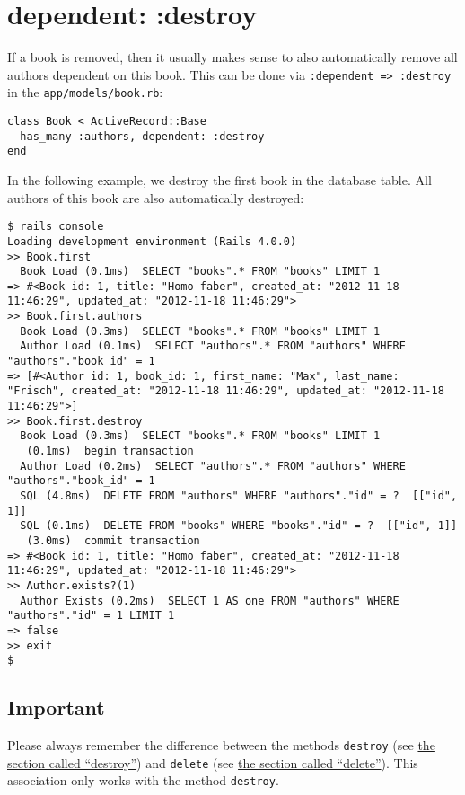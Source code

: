 \documentclass[a4paper]{book}
\newcounter{tab}[chapter]
\newcommand{\chap}[1]{\newpage\thispagestyle{empty}\chapter{#1}\label{chap:\thechapter}}
\begin{document}
\chap{dependent: :destroy}\label{dependent-destroy}

If a book is removed, then it usually makes sense to also automatically remove all authors dependent on this book. This can be done via \texttt{:dependent =\textgreater{} :destroy} in the \texttt{app/models/book.rb}:

\begin{shaded}\begin{verbatim}
class Book < ActiveRecord::Base
  has_many :authors, dependent: :destroy
end
\end{verbatim}\end{shaded}

In the following example, we destroy the first book in the database table. All authors of this book are also automatically destroyed:

\begin{shaded}\begin{verbatim}
$ rails console
Loading development environment (Rails 4.0.0)
>> Book.first
  Book Load (0.1ms)  SELECT "books".* FROM "books" LIMIT 1
=> #<Book id: 1, title: "Homo faber", created_at: "2012-11-18 11:46:29", updated_at: "2012-11-18 11:46:29">
>> Book.first.authors
  Book Load (0.3ms)  SELECT "books".* FROM "books" LIMIT 1
  Author Load (0.1ms)  SELECT "authors".* FROM "authors" WHERE "authors"."book_id" = 1
=> [#<Author id: 1, book_id: 1, first_name: "Max", last_name: "Frisch", created_at: "2012-11-18 11:46:29", updated_at: "2012-11-18 11:46:29">]
>> Book.first.destroy
  Book Load (0.3ms)  SELECT "books".* FROM "books" LIMIT 1
   (0.1ms)  begin transaction
  Author Load (0.2ms)  SELECT "authors".* FROM "authors" WHERE "authors"."book_id" = 1
  SQL (4.8ms)  DELETE FROM "authors" WHERE "authors"."id" = ?  [["id", 1]]
  SQL (0.1ms)  DELETE FROM "books" WHERE "books"."id" = ?  [["id", 1]]
   (3.0ms)  commit transaction
=> #<Book id: 1, title: "Homo faber", created_at: "2012-11-18 11:46:29", updated_at: "2012-11-18 11:46:29">
>> Author.exists?(1)
  Author Exists (0.2ms)  SELECT 1 AS one FROM "authors" WHERE "authors"."id" = 1 LIMIT 1
=> false
>> exit
$
\end{verbatim}\end{shaded}

\section{Important}\label{important-8}

Please always remember the difference between the methods \texttt{destroy} (see \hyperref[activerecordux5fdestroy]{the section called “destroy”}) and \texttt{delete} (see \hyperref[activerecordux5fdelete]{the section called “delete”}). This association only works with the method \texttt{destroy}.
\end{document}
